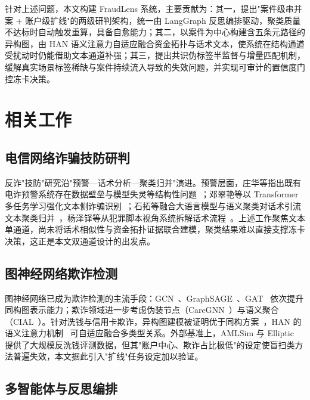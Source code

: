 \documentclass[12pt,a4paper,fontset=windows]{ctexart}
\begin{document}
针对上述问题，本文构建 FraudLens 系统，主要贡献为：其一，提出"案件级串并案 + 账户级扩线"的两级研判架构，统一由 LangGraph 反思编排驱动，聚类质量不达标时自动触发重算，具备自愈能力；其二，以案件为中心构建含五条元路径的异构图，由 HAN 语义注意力自适应融合资金拓扑与话术文本，使系统在结构通道受扰动时仍能借助文本通道补强；其三，提出共识伪标签半监督与增量匹配机制，缓解真实场景标签稀缺与案件持续流入导致的失效问题，并实现可审计的置信度门控冻卡决策。

\section{相关工作}

\subsection{电信网络诈骗技防研判}

反诈"技防"研究沿"预警—话术分析—聚类归并"演进。预警层面，庄华等指出既有电诈预警系统存在数据壁垒与模型失灵等结构性问题~\cite{zhuang2025warning}；邓翠艳等以 Transformer 多任务学习强化文本侧诈骗识别~\cite{deng2024transformer}；石拓等融合大语言模型与语义聚类对话术引流文本聚类归并~\cite{shi2025llmsemantic}，杨泽铎等从犯罪脚本视角系统拆解话术流程~\cite{yang2025crimescript}。上述工作聚焦文本单通道，尚未将话术相似性与资金拓扑证据联合建模，聚类结果难以直接支撑冻卡决策，这正是本文双通道设计的出发点。

\subsection{图神经网络欺诈检测}

图神经网络已成为欺诈检测的主流手段：GCN~\cite{kipf2017gcn}、GraphSAGE~\cite{hamilton2017graphsage}、GAT~\cite{velickovic2018gat} 依次提升同构图表示能力；欺诈领域进一步考虑伪装节点（CareGNN~\cite{dou2020caregnn}）与语义聚合（CIAL~\cite{zhang2024ciesgnn}）。针对洗钱与信用卡欺诈，异构图建模被证明优于同构方案~\cite{wu2023moneylaunder,liu2025creditcardhan}，HAN 的语义注意力机制~\cite{wang2019han} 可自适应融合多类型关系。外部基准上，AMLSim 与 Elliptic~\cite{weber2018amlfirstlook,weber2019elliptic} 提供了大规模反洗钱评测数据，但其"账户中心、欺诈占比极低"的设定使盲扫类方法普遍失效，本文据此引入"扩线"任务设定加以验证。

\subsection{多智能体与反思编排}
\end{document}
